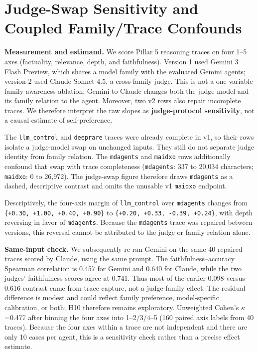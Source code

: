 \clearpage
\section{Judge-Swap Sensitivity and Coupled Family/Trace Confounds}\label{sec-7-5}

\textbf{Measurement and estimand.} We score Pillar 5 reasoning traces on four
1--5 axes (factuality, relevance, depth, and faithfulness). Version 1 used
Gemini 3 Flash Preview, which shares a model family with the evaluated
Gemini agents; version 2 used Claude Sonnet 4.5, a cross-family judge. This is
not a one-variable family-awareness ablation: Gemini-to-Claude changes both
the judge model and its family relation to the agent. Moreover, two v2 rows
also repair incomplete traces. We therefore interpret the raw slopes as
\textbf{judge-protocol sensitivity}, not a causal estimate of self-preference.

The \texttt{llm\_control} and \texttt{deeprare} traces were already complete in v1, so their
rows isolate a judge-model swap on unchanged inputs. They still do not
separate judge identity from family relation. The \texttt{mdagents} and \texttt{maidxo}
rows additionally confound that swap with trace completeness (\texttt{mdagents}:
337 to 20,034 characters; \texttt{maidxo}: 0 to 26,972). The judge-swap figure therefore draws
\texttt{mdagents} as a dashed, descriptive contrast and omits the unusable v1
\texttt{maidxo} endpoint.

Descriptively, the four-axis margin of \texttt{llm\_control} over \texttt{mdagents} changes
from \texttt{\{+0.30,\ +1.00,\ +0.40,\ +0.90\}} to
\texttt{\{+0.20,\ +0.33,\ -0.39,\ +0.24\}}, with depth reversing in favor of
\texttt{mdagents}. Because the \texttt{mdagents} trace was repaired between versions, this
reversal cannot be attributed to the judge or family relation alone.

\textbf{Same-input check.} We subsequently re-ran Gemini on the same 40 repaired
traces scored by Claude, using the same prompt. The faithfulness--accuracy
Spearman correlation is 0.457 for Gemini and 0.640 for Claude, while the two
judges' faithfulness scores agree at 0.741. Thus most of the earlier
0.098-versus-0.616 contrast came from trace capture, not a judge-family
effect. The residual difference is modest and could reflect family
preference, model-specific calibration, or both; H10 therefore remains
exploratory. Unweighted Cohen's \ensuremath{\kappa}=0.477 after binning the four axes into 1--2/3/4--5
(160 paired axis labels from 40 traces). Because the four axes within a trace
are not independent and there are only 10 cases per agent, this is a
sensitivity check rather than a precise effect estimate.

